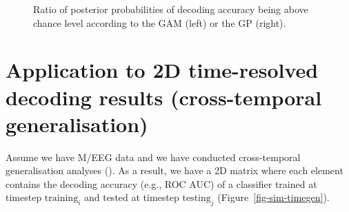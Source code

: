 \documentclass[
  doc,
  floatsintext,
  longtable,
  a4paper,
  nolmodern,
  notxfonts,
  notimes,
  colorlinks=true,linkcolor=blue,citecolor=blue,urlcolor=blue]{apa7}
\begin{document}
\begin{figure}[!htb]

\caption{\label{fig-decoding-ratio}Ratio of posterior probabilities of
decoding accuracy being above chance level according to the GAM (left)
or the GP (right).}


\end{figure}%

\newpage

\section{Application to 2D time-resolved decoding results
(cross-temporal
generalisation)}\label{application-to-2d-time-resolved-decoding-results-cross-temporal-generalisation}

Assume we have M/EEG data and we have conducted cross-temporal
generalisation analyses (). As a result, we have a 2D matrix where each element contains the
decoding accuracy (e.g., ROC AUC) of a classifier trained at timestep
\(\text{training}_{i}\) and tested at timestep \(\text{testing}_{j}\)
(Figure~\ref{fig-sim-timegen}).
\end{document}
